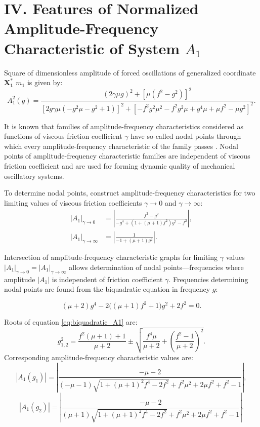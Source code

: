 \documentclass[12pt, a4paper]{article}
\begin{document}
	\section*{IV. Features of Normalized Amplitude-Frequency Characteristic of System $A_1$}
	
	Square of dimensionless amplitude of forced oscillations of generalized coordinate $\mathbf{X^{*}_{1}}$ $m_1$ is given by:
	\begin{equation}
		A_1^2(g) = \frac{(2\gamma\mu g)^2 + [\mu(f^2 - g^2)]^2}{
			[2g\gamma\mu(-g^2\mu - g^2 + 1)]^2 + 
			[-f^2g^2\mu^2 - f^2g^2\mu + g^4\mu + \mu f^2 - \mu g^2]^2
		}.
		\label{eq:A1}
	\end{equation}
	
	It is known that families of amplitude-frequency characteristics considered as functions of viscous friction coefficient $\gamma$ have so-called nodal points through which every amplitude-frequency characteristic of the family passes \cite{DenHartog1956}. Nodal points of amplitude-frequency characteristic families are independent of viscous friction coefficient and are used for forming dynamic quality of mechanical oscillatory systems.    
	
	To determine nodal points, construct amplitude-frequency characteristics for two limiting values of viscous friction coefficients $\gamma \to 0$ and $\gamma \to \infty$:
	\begin{align}
		|A_1|_{\gamma \to 0} &= \left| \frac{f^2 - g^2}{-g^4 + (1 + (\mu+1)f^2)g^2 - f^2} \right|,
		\label{eq:A1_gamma0} \\
		|A_1|_{\gamma \to \infty} &= \left| \frac{1}{-1 + (\mu+1)g^2} \right|.
		\label{eq:A1_gammainf}
	\end{align}
	
	
	Intersection of amplitude-frequency characteristic graphs for limiting $\gamma$ values $|A_1|_{\gamma \to 0} = |A_1|_{\gamma \to \infty}$ allows determination of nodal points---frequencies where amplitude $|A_1|$ is independent of friction coefficient $\gamma$. Frequencies determining nodal points are found from the biquadratic equation in frequency $g$:
	
	\begin{equation}
		(\mu+2) g^4 - 2\bigl((\mu+1)f^2 + 1\bigr) g^2 + 2f^2 = 0.
		\label{eq:biquadratic_A1}
	\end{equation}
	
	Roots of equation \eqref{eq:biquadratic_A1} are:
	\begin{equation}
		g_{1,2}^2 = \frac{f^2(\mu+1)+1}{\mu+2} \pm 
		\sqrt{\frac{f^4\mu}{\mu+2} + \left(\frac{f^2-1}{\mu+2}\right)^2}.
		\label{eq:g12_general}
	\end{equation}
	Corresponding amplitude-frequency characteristic values are:
	\begin{equation}
		|A_1(g_1)| = \left| \frac{-\mu -2}{\left(-\mu -1\right) \sqrt{1+\left(\mu +1\right)^{2} f^{4}-2 f^{2}}+f^{2} \mu^{2}+2 \mu f^{2}+f^{2}-1} \right|,
	\end{equation}
	\begin{equation}
		|A_1(g_2)| = \left| \frac{-\mu -2}{\left(\mu + 1\right) \sqrt{1+\left(\mu +1\right)^{2} f^{4}-2 f^{2}}+f^{2} \mu^{2}+2 \mu f^{2}+f^{2}-1} \right|.
	\end{equation}
	
\end{document}
